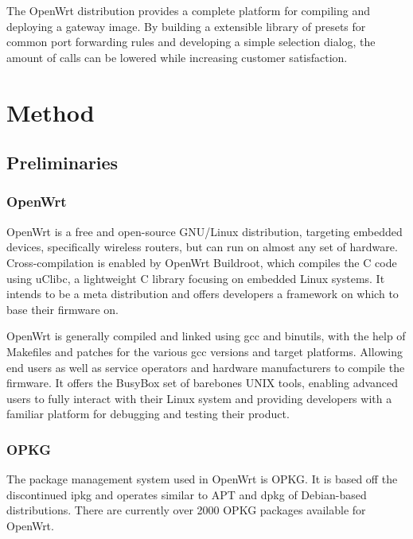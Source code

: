 \documentclass[a4paper,11pt]{kth-mag}
\begin{document}
The OpenWrt distribution provides a complete platform for compiling and deploying a gateway image.
By building a extensible library of presets for common port forwarding rules
and developing a simple selection dialog, the amount of calls can be lowered
while increasing customer satisfaction.




\chapter{Method}

\section{Preliminaries}

\subsection{OpenWrt}
OpenWrt is a free and open-source GNU/Linux distribution, targeting embedded devices, specifically wireless routers, but can run on almost any set of hardware.
Cross-compilation is enabled by OpenWrt Buildroot, which compiles the C code using uClibc, a lightweight C library focusing on embedded Linux systems. 
It intends to be a meta distribution and offers developers a framework on which to base their firmware on.

OpenWrt is generally compiled and linked using gcc and binutils, with the help of Makefiles and patches for the various gcc versions and target platforms.
Allowing end users as well as service operators and hardware manufacturers to compile the firmware.
It offers the BusyBox set of barebones UNIX tools, enabling advanced users to fully interact with their Linux system and providing developers with a familiar platform for debugging and testing their product.
\cite{OpenWrt:structure_design}

\subsection{OPKG}
The package management system used in OpenWrt is OPKG. It is based off the discontinued ipkg and operates similar to APT and dpkg of Debian-based distributions.
There are currently over 2000 OPKG packages available for OpenWrt.
\end{document}
